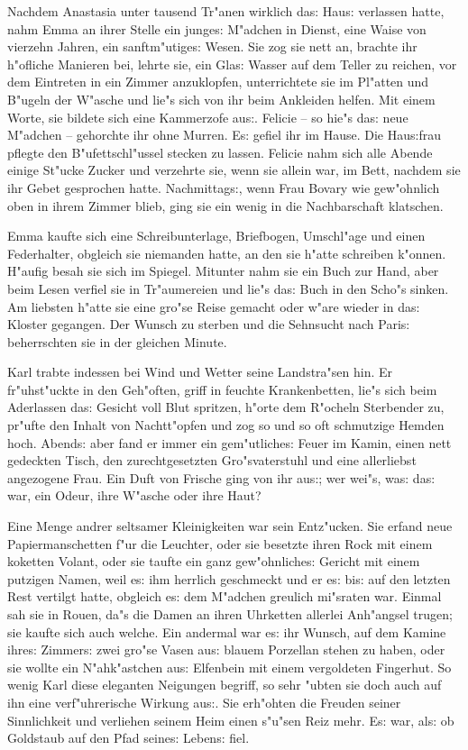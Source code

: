 \documentclass[oneside,12pt]{book}
\newcommand{\s}{s:}%
\begin{document}
Nachdem Anastasia unter tausend Tr"anen wirklich da{\s} Hau{\s}
verlassen hatte, nahm Emma an ihrer Stelle ein junge{\s} M"adchen
in Dienst, eine Waise von vierzehn Jahren, ein sanftm"utige{\s}
Wesen. Sie zog sie nett an, brachte ihr h"ofliche Manieren bei,
lehrte sie, ein Gla{\s} Wasser auf dem Teller zu reichen, vor dem
Eintreten in ein Zimmer anzuklopfen, unterrichtete sie im Pl"atten
und B"ugeln der W"asche und lie"s sich von ihr beim Ankleiden
helfen. Mit einem Worte, sie bildete sich eine Kammerzofe au{\s}.
Felicie -- so hie"s da{\s} neue M"adchen -- gehorchte ihr ohne
Murren. E{\s} gefiel ihr im Hause. Die Hau{\s}frau pflegte den
B"ufettschl"ussel stecken zu lassen. Felicie nahm sich alle Abende
einige St"ucke Zucker und verzehrte sie, wenn sie allein war, im
Bett, nachdem sie ihr Gebet gesprochen hatte. Nachmittag{\s}, wenn
Frau Bovary wie gew"ohnlich oben in ihrem Zimmer blieb, ging sie
ein wenig in die Nachbarschaft klatschen.

Emma kaufte sich eine Schreibunterlage, Briefbogen, Umschl"age und
einen Federhalter, obgleich sie niemanden hatte, an den sie h"atte
schreiben k"onnen. H"aufig besah sie sich im Spiegel. Mitunter
nahm sie ein Buch zur Hand, aber beim Lesen verfiel sie in
Tr"aumereien und lie"s da{\s} Buch in den Scho"s sinken. Am
liebsten h"atte sie eine gro"se Reise gemacht oder w"are wieder in
da{\s} Kloster gegangen. Der Wunsch zu sterben und die Sehnsucht
nach Pari{\s} beherrschten sie in der gleichen Minute.

Karl trabte indessen bei Wind und Wetter seine Landstra"sen hin.
Er fr"uhst"uckte in den Geh"often, griff in feuchte Krankenbetten,
lie"s sich beim Aderlassen da{\s} Gesicht voll Blut spritzen,
h"orte dem R"ocheln Sterbender zu, pr"ufte den Inhalt von
Nachtt"opfen und zog so und so oft schmutzige Hemden hoch.
Abend{\s} aber fand er immer ein gem"utliche{\s} Feuer im Kamin,
einen nett gedeckten Tisch, den zurechtgesetzten Gro"svaterstuhl
und eine allerliebst angezogene Frau. Ein Duft von Frische ging
von ihr au{\s}; wer wei"s, wa{\s} da{\s} war, ein Odeur, ihre
W"asche oder ihre Haut?

Eine Menge andrer seltsamer Kleinigkeiten war sein Ent\/z"ucken. Sie
erfand neue Papiermanschetten f"ur die Leuchter, oder sie besetzte
ihren Rock mit einem koketten Volant, oder sie taufte ein ganz
gew"ohnliche{\s} Gericht mit einem putzigen Namen, weil e{\s} ihm
herrlich geschmeckt und er e{\s} bi{\s} auf den letzten Rest
vertilgt hatte, obgleich e{\s} dem M"adchen greulich mi"sraten
war. Einmal sah sie in Rouen, da"s die Damen an ihren Uhrketten
allerlei Anh"angsel trugen; sie kaufte sich auch welche. Ein
andermal war e{\s} ihr Wunsch, auf dem Kamine ihre{\s} Zimmer{\s}
zwei gro"se Vasen au{\s} blauem Porzellan stehen zu haben, oder
sie wollte ein N"ahk"astchen au{\s} Elfenbein mit einem
vergoldeten Fingerhut. So wenig Karl diese eleganten Neigungen
begriff, so sehr "ubten sie doch auch auf ihn eine verf"uhrerische
Wirkung au{\s}. Sie erh"ohten die Freuden seiner Sinnlichkeit und
verliehen seinem Heim einen s"u"sen Reiz mehr. E{\s} war, al{\s}
ob Goldstaub auf den Pfad seine{\s} Leben{\s} fiel.
\end{document}

